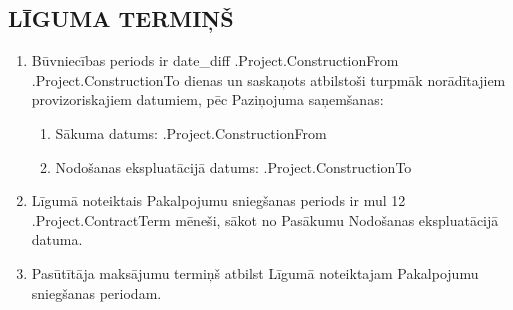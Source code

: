 \subsection{LĪGUMA TERMIŅŠ}
\begin{enumerate}
	\item Būvniecības periods ir {{date_diff .Project.ConstructionFrom .Project.ConstructionTo}} dienas un saskaņots atbilstoši turpmāk norādītajiem provizoriskajiem datumiem, pēc Paziņojuma saņemšanas:
	\begin{enumerate}
		\item Sākuma datums:                  \iffalse input project.construction_from value="{{.Project.ConstructionFrom}}" type="date" \fi {{.Project.ConstructionFrom}}
		\item Nodošanas ekspluatācijā datums: \iffalse input project.construction_to value="{{.Project.ConstructionTo}}" type="date" \fi {{.Project.ConstructionTo}}
	\end{enumerate}
	\item Līgumā noteiktais Pakalpojumu sniegšanas periods ir {{mul 12 .Project.ContractTerm}} mēneši, sākot no Pasākumu Nodošanas ekspluatācijā datuma.
	\item Pasūtītāja maksājumu termiņš atbilst Līgumā noteiktajam Pakalpojumu sniegšanas periodam.
\end{enumerate}


